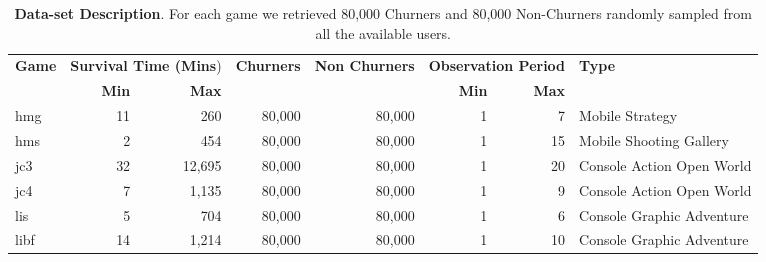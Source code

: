 \begin{table}[h] 
\centering
\caption{\textbf{Data-set Description}. For each game we retrieved 80,000 Churners and 80,000 Non-Churners randomly sampled from all the available users.}
\label{gamesdescription}
\begin{tabularx}{\textwidth}{@{}lrrrrrrX@{}}
\toprule

\multirow{2}{*}{\textbf{Game}} & \multicolumn{2}{l}{\textbf{Survival Time (Mins})} & \multirow{2}{*}{\textbf{Churners}} & \multirow{2}{*}{\textbf{Non Churners}} & \multicolumn{2}{l}{\textbf{Observation Period}} & \multirow{2}{*}{\textbf{Type}} \\ \cmidrule(lr){2-3} \cmidrule(lr){6-7}
                      & \textbf{Min}                  & \textbf{Max}                  &                           &                               & \textbf{Min}                & \textbf{Max}               &                                \\ \midrule
hmg                        & 11 & 260    & 80,000 & 80,000  & 1  & 7  & Mobile Strategy                       \\
hms                        & 2 & 454     & 80,000 & 80,000  & 1  & 15 & Mobile Shooting Gallery                \\
jc3                        & 32 & 12,695 & 80,000 & 80,000  & 1  & 20 & Console Action Open World             \\
jc4                        & 7 & 1,135   & 80,000 & 80,000  & 1  & 9  & Console Action Open World           \\
lis                        & 5 & 704     & 80,000 & 80,000  & 1  & 6  & Console Graphic Adventure \\
libf                       & 14 & 1,214  & 80,000 & 80,000  & 1  & 10 &  Console Graphic Adventure \\ \bottomrule
\end{tabularx}
\end{table}